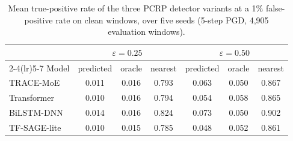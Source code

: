 \begin{table}[tbp]
\caption{Mean true-positive rate of the three PCRP detector variants at a 1\% false-positive rate on clean windows, over five seeds (5-step PGD, 4,905 evaluation windows).}
\label{tab:pcrp_tpr}
\begin{tabular*}{\textwidth}{@{\extracolsep\fill}lcccccc@{}}
\toprule
 & \multicolumn{3}{c}{$\varepsilon = 0.25$} & \multicolumn{3}{c}{$\varepsilon = 0.50$} \\
\cmidrule(lr){2-4}\cmidrule(lr){5-7}
Model & predicted & oracle & nearest & predicted & oracle & nearest \\
\midrule
TRACE-MoE & 0.011 & 0.016 & 0.793 & 0.063 & 0.050 & 0.867 \\
Transformer & 0.010 & 0.016 & 0.794 & 0.054 & 0.058 & 0.865 \\
BiLSTM-DNN & 0.014 & 0.016 & 0.824 & 0.073 & 0.050 & 0.902 \\
TF-SAGE-lite & 0.010 & 0.015 & 0.785 & 0.048 & 0.052 & 0.861 \\
\bottomrule
\end{tabular*}
\end{table}
